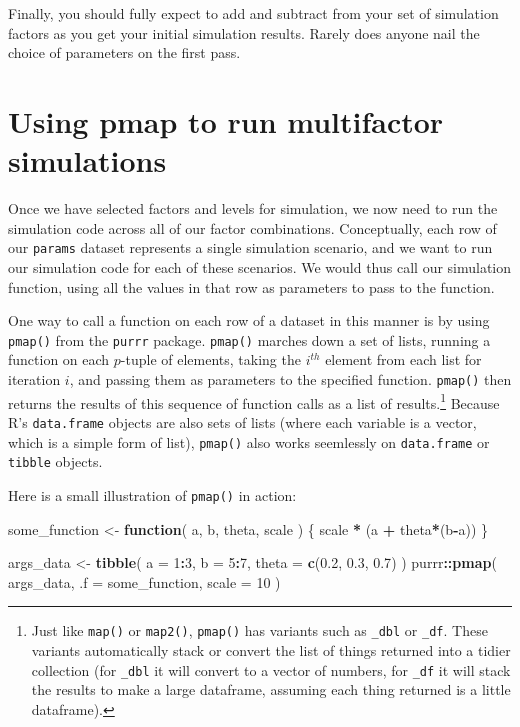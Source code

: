 \documentclass[
]{book}
\newenvironment{Shaded}{\begin{snugshade}}{\end{snugshade}}
\newcommand{\AttributeTok}[1]{\textcolor[rgb]{0.13,0.29,0.53}{#1}}
\newcommand{\ControlFlowTok}[1]{\textcolor[rgb]{0.13,0.29,0.53}{\textbf{#1}}}
\newcommand{\DecValTok}[1]{\textcolor[rgb]{0.00,0.00,0.81}{#1}}
\newcommand{\FloatTok}[1]{\textcolor[rgb]{0.00,0.00,0.81}{#1}}
\newcommand{\FunctionTok}[1]{\textcolor[rgb]{0.13,0.29,0.53}{\textbf{#1}}}
\newcommand{\NormalTok}[1]{#1}
\newcommand{\OtherTok}[1]{\textcolor[rgb]{0.56,0.35,0.01}{#1}}
\newcommand{\SpecialCharTok}[1]{\textcolor[rgb]{0.81,0.36,0.00}{\textbf{#1}}}
\begin{document}
Finally, you should fully expect to add and subtract from your set of simulation factors as you get your initial simulation results. Rarely does anyone nail the choice of parameters on the first pass.

\section{Using pmap to run multifactor simulations}\label{using-pmap-to-run-multifactor-simulations}

Once we have selected factors and levels for simulation, we now need to run the simulation code across all of our factor combinations.
Conceptually, each row of our \texttt{params} dataset represents a single simulation scenario, and we want to run our simulation code for each of these scenarios.
We would thus call our simulation function, using all the values in that row as parameters to pass to the function.

One way to call a function on each row of a dataset in this manner is by using \texttt{pmap()} from the \texttt{purrr} package.
\texttt{pmap()} marches down a set of lists, running a function on each \(p\)-tuple of elements, taking the \(i^{th}\) element from each list for iteration \(i\), and passing them as parameters to the specified function.
\texttt{pmap()} then returns the results of this sequence of function calls as a list of results.\footnote{Just like \texttt{map()} or \texttt{map2()}, \texttt{pmap()} has variants such as \texttt{\_dbl} or \texttt{\_df}.
  These variants automatically stack or convert the list of things returned into a tidier collection (for \texttt{\_dbl} it will convert to a vector of numbers, for \texttt{\_df} it will stack the results to make a large dataframe, assuming each thing returned is a little dataframe).}
Because R's \texttt{data.frame} objects are also sets of lists (where each variable is a vector, which is a simple form of list), \texttt{pmap()} also works seemlessly on \texttt{data.frame} or \texttt{tibble} objects.

Here is a small illustration of \texttt{pmap()} in action:

\begin{Shaded}
\begin{Highlighting}[]
\NormalTok{some\_function }\OtherTok{\textless{}{-}} \ControlFlowTok{function}\NormalTok{( a, b, theta, scale ) \{}
\NormalTok{    scale }\SpecialCharTok{*}\NormalTok{ (a }\SpecialCharTok{+}\NormalTok{ theta}\SpecialCharTok{*}\NormalTok{(b}\SpecialCharTok{{-}}\NormalTok{a))}
\NormalTok{\}}

\NormalTok{args\_data }\OtherTok{\textless{}{-}} \FunctionTok{tibble}\NormalTok{( }\AttributeTok{a =} \DecValTok{1}\SpecialCharTok{:}\DecValTok{3}\NormalTok{, }\AttributeTok{b =} \DecValTok{5}\SpecialCharTok{:}\DecValTok{7}\NormalTok{, }\AttributeTok{theta =} \FunctionTok{c}\NormalTok{(}\FloatTok{0.2}\NormalTok{, }\FloatTok{0.3}\NormalTok{, }\FloatTok{0.7}\NormalTok{) )}
\NormalTok{purrr}\SpecialCharTok{::}\FunctionTok{pmap}\NormalTok{( args\_data, }\AttributeTok{.f =}\NormalTok{ some\_function, }\AttributeTok{scale =} \DecValTok{10}\NormalTok{ )}
\end{Highlighting}
\end{Shaded}
\end{document}

